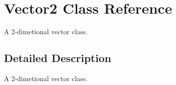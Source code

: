 \hypertarget{class_vector2}{\section{Vector2 Class Reference}
\label{class_vector2}
}


A 2-\/dimetional vector class.  




\subsection{Detailed Description}
A 2-\/dimetional vector class. 